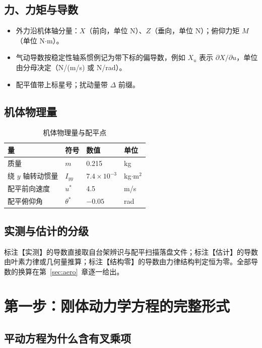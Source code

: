 \documentclass[11pt,a4paper]{ctexart}
\begin{document}
\subsection{力、力矩与导数}

\begin{itemize}[itemsep=2pt]
  \item 外力沿机体轴分量：$X$（前向，单位 N）、$Z$（垂向，单位 N）；俯仰力矩 $M$（单位 N$\cdot$m）。
  \item 气动导数按稳定性轴系惯例记为带下标的偏导数，例如 $X_u$ 表示 $\partial X/\partial u$，单位由分母决定（N/(m/s) 或 N/rad）。
  \item 配平值带上标星号；扰动量带 $\Delta$ 前缀。
\end{itemize}

\subsection{机体物理量}

\begin{table}[htbp]
\centering
\begin{tabular}{llll}
\toprule
量 & 符号 & 数值 & 单位 \\
\midrule
质量 & $m$ & 0.215 & kg \\
绕 $y$ 轴转动惯量 & $I_{yy}$ & $7.4\times10^{-3}$ & kg$\cdot$m$^2$ \\
配平前向速度 & $u^{*}$ & 4.5 & m/s \\
配平俯仰角 & $\theta^{*}$ & $-0.05$ & rad \\
\bottomrule
\end{tabular}
\caption{机体物理量与配平点}
\end{table}

\subsection{实测与估计的分级}

标注【实测】的导数直接取自台架辨识与配平扫描落盘文件；标注【估计】的导数由叶素力律或几何量推算；标注【结构零】的导数由力律结构判定恒为零。全部导数的换算在第~\ref{sec:aero}~章逐一给出。

\section{第一步：刚体动力学方程的完整形式}\label{sec:newton}

\subsection{平动方程为什么含有叉乘项}
\end{document}
